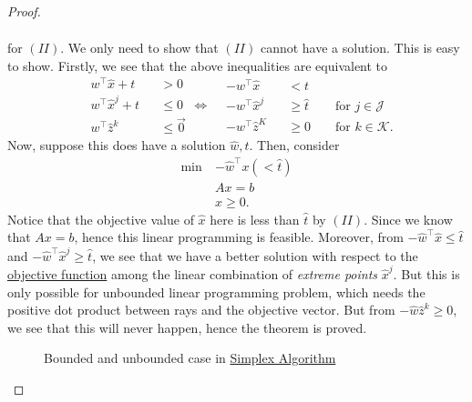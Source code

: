 \begin{proof}
\begin{enumerate}
\[\begin{split}
			      \end{split}
		      \]
		      for \((II)\). We only need to show that \((II)\) cannot have a solution. This is easy to show. Firstly,
		      we see that the above inequalities are equivalent to
		      \[
			      \begin{alignedat}{3}
				      &w^{\top}\hat{x}+t&&>0\\
				      &w^{\top}\hat{x}^j + t&&\leq 0\\
				      &w^{\top}\hat{z}^k &&\leq \vec{0}
			      \end{alignedat}\iff\begin{alignedat}{3}
				      &-w^{\top}\hat{x}&&<t\\
				      &-w^{\top}\hat{x}^j &&\geq \hat{t} &&\text{ for }j\in\mathcal{J}\\
				      &-w^{\top}\hat{z}^K &&\geq 0 &&\text{ for }k\in\mathcal{K}.
			      \end{alignedat}
		      \]
		      Now, suppose this does have a solution \(\hat{w}, \hat{t}\). Then, consider
		      \[
			      \begin{aligned}
				      \min~ & -\hat{w}^{\top}x(<\hat{t}) \\
				            & Ax = b                     \\
				            & x\geq 0.
			      \end{aligned}
		      \]
		      Notice that the objective value of \(\hat{x}\) here is less than \(\hat{t}\) by \((II)\). Since we know that
		      \(Ax = b\), hence this linear programming is feasible. Moreover, from \(-\hat{w}^{\top}\hat{x}\leq \hat{t}\) and
		      \(-\hat{w}^{\top}\hat{x}^j\geq \hat{t}\), we see that we have a better solution with respect to the \hyperref[def:objective-function]{objective function}
		      among the linear combination of \emph{extreme points} \(\hat{x}^j\). But this is only possible for unbounded linear
		      programming problem, which needs the positive dot product between rays and the objective vector. But from
		      \(-\hat{w}\hat{z}^k\geq 0\), we see that this will never happen, hence the theorem is proved.
		      \begin{figure}[H]
			      \centering
			      \caption{Bounded and unbounded case in \hyperref[algo:simplex-algorithm]{Simplex Algorithm}}
			      \label{fig:representation-theorem}
		      \end{figure}
	\end{enumerate}
\end{proof}

